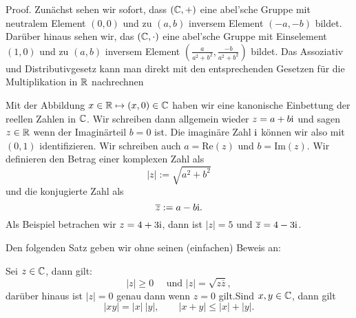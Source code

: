 \begin{emphBox}{}{}
Proof.  Zunächst sehen wir sofort, dass \((\mathbb{C},+)\) eine abel’sche Gruppe mit neutralem Element \((0,0)\) und zu \((a,b)\) inversem Element \((-a,-b)\) bildet. Darüber hinaus sehen wir, das \((\mathbb{C},\cdot)\) eine abel’sche Gruppe mit Einselement \((1,0)\) und zu \((a,b)\) inversem Element \((\frac{a}{a^2+b^2},  \frac{-b}{a^2+b^2}) \) bildet. Das Assoziativ  und Distributivgesetz kann man direkt mit den entsprechenden Gesetzen für die Multiplikation in \(\mathbb{R}\) nachrechnen
\end{emphBox}

Mit der Abbildung \(x \in \mathbb{R} \mapsto (x,0) \in \mathbb{C}\) haben wir eine kanonische Einbettung der reellen Zahlen in \(\mathbb{C}\). Wir schreiben dann allgemein wieder \(z=a+b\mathrm{i}\) und sagen \(z \in\mathbb{R}\) wenn der Imaginärteil \(b=0\) ist.  Die imaginäre Zahl \(\mathrm{i}\) können wir also mit \((0,1)\) identifizieren.  Wir schreiben auch \(a=\)Re\((z)\) und \(b=\)Im\((z)\). Wir definieren den Betrag einer komplexen Zahl als
\begin{equation*}
 |z| := \sqrt{a^2+b^2}
\end{equation*}
und die konjugierte Zahl als
\begin{equation*}
 \overline{z} := a - b \mathrm{i}.
\end{equation*}
Als Beispiel betrachen wir \(z= 4+3\mathrm{i}\), dann ist \(|z|=5\) und \(\overline{z}=4-3\mathrm{i}\).

Den folgenden Satz geben wir ohne seinen (einfachen) Beweis an:
\label{grundlagen/zahlensysteme:theorem-30}
\begin{theorem}{}{}



Sei \(z \in \mathbb{C} \), dann gilt:
\begin{equation*}
  |z| \geq 0\quad \text{ und } |z|=\sqrt{z \overline{z}},
\end{equation*}
darüber hinaus ist \(|z|=0\) genau dann wenn \(z=0\) gilt.Sind \(x,y \in \mathbb{C}\), dann gilt
\begin{equation*}
 |xy|=|x|~|y|,\qquad |x+y| \leq |x|+|y| .
\end{equation*}\end{theorem}

